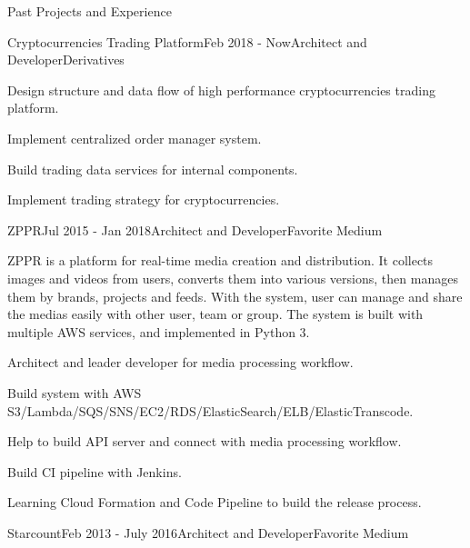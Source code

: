 \documentclass{resume} %
\begin{document}
\begin{rSection}{Past Projects and Experience}

\begin{rSubsection}{Cryptocurrencies Trading Platform}{Feb 2018 - Now}{Architect and Developer}{Derivatives}
\begin{rSubsectionList}
\item Design structure and data flow of high performance cryptocurrencies trading platform.
\item Implement centralized order manager system.
\item Build trading data services for internal components.
\item Implement trading strategy for cryptocurrencies.
\end{rSubsectionList}
\end{rSubsection}


\begin{rSubsection}{ZPPR}{Jul 2015 - Jan 2018}{Architect and Developer}{Favorite Medium}

ZPPR is a platform for real-time media creation and distribution. It collects images and videos from users, converts them into various versions, then manages them by brands, projects and feeds. With the system, user can manage and share the medias easily with other user, team or group. The system is built with multiple AWS services, and implemented in Python 3.

\begin{rSubsectionList}
\item Architect and leader developer for media processing workflow.
\item Build system with AWS S3/Lambda/SQS/SNS/EC2/RDS/ElasticSearch/ELB/ElasticTranscode.
\item Help to build API server and connect with media processing workflow.
\item Build CI pipeline with Jenkins.
\item Learning Cloud Formation and Code Pipeline to build the release process.
\end{rSubsectionList}
\end{rSubsection}


\begin{rSubsection}{Starcount}{Feb 2013 - July 2016}{Architect and Developer}{Favorite Medium}


\end{rSubsection}
\end{rSection}
\end{document}
